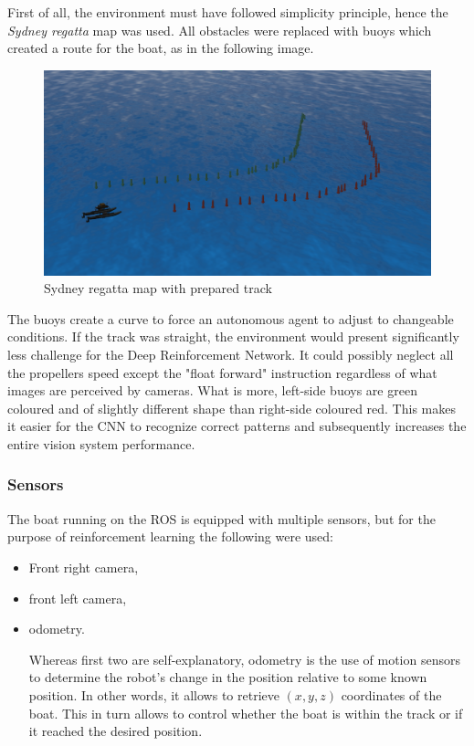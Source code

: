 First of all, the environment must have followed simplicity principle, hence the \emph{Sydney regatta} map was used. All obstacles were replaced with buoys which created a route for the boat, as in the following image. 

\begin{figure}[h]
    \centering
    \includegraphics[width=16cm]{img/simulation_view.png}
    \caption{Sydney regatta map with prepared track}
    \label{fig:sydney-regatta-map}
\end{figure}

The buoys create a curve to force an autonomous agent to adjust to changeable conditions. If the track was straight, the environment would present significantly less challenge for the Deep Reinforcement Network. It could possibly neglect all the propellers speed except the "float forward" instruction regardless of what images are perceived by cameras. What is more, left-side buoys are green coloured and of slightly different shape than right-side coloured red. This makes it easier for the CNN to recognize correct patterns and subsequently increases the entire vision system performance.

\subsubsection*{Sensors}
\label{sub2:sensors}

The boat running on the ROS is equipped with multiple sensors, but for the purpose of reinforcement learning the following were used:
\begin{itemize}
    \item Front right camera,
    \item front left camera,
    \item odometry.

    Whereas first two are self-explanatory, odometry is the use of motion sensors to determine the robot's change in the position relative to some known position. In other words, it allows to retrieve $(x, y, z)$ coordinates of the boat. This in turn allows to control whether the boat is within the track or if it reached the desired position.  
\end{itemize}

